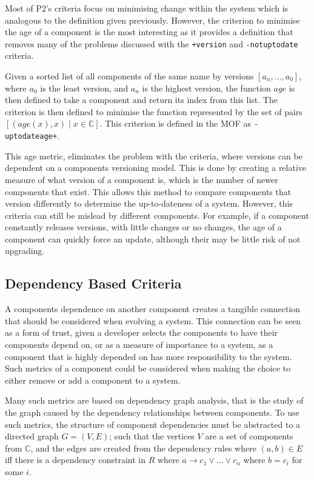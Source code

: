Most of P2's criteria focus on minimising change within the system which is analogous to the definition given previously.
However, the criterion to minimise the age of a component is the most interesting as it provides a definition that removes many of the problems
discussed with the  \verb!+version! and \verb+-notuptodate+ criteria.

\begin{defs}
Given a sorted list of all components of the same name by versions $[a_n,\ldots,a_0]$, where $a_0$ is the least version, and $a_n$ is the highest version,
the function $age$ is then defined to take a component and return its index from this list.
The criterion is then defined to minimise the function represented by the set of pairs $[(age(x), x) \mid x \in \mathbb{C}]$.
This criterion is defined in the MOF as \verb!-uptodateage+!.
\end{defs}

This age metric, eliminates the problem with the criteria, where versions can be dependent on a components versioning model.
This is done by creating a relative measure of what version of a component is, which is the number of newer components that exist.
This allows this method to compare components that version differently to determine the up-to-dateness of a system.
However, this criteria can still be mislead by different components.
For example, if a component constantly releases versions, with little changes or no changes, the age of a component can quickly force an update, 
although their may be little risk of not upgrading. 


\subsection{Dependency Based Criteria}
A components dependence on another component creates a tangible connection that should be considered when evolving a system.
This connection can be seen as a form of trust, given a developer selects the components to have their components depend on,
or as a measure of importance to a system, as a component that is highly depended on has more responsibility to the system.
Such metrics of a component could be considered when making the choice to either remove or add a component to a system.

Many such metrics are based on dependency graph analysis, that is the study of the graph caused by the dependency relationships between components. 
To use such metrics, the structure of component dependencies must be abstracted to a directed graph $G = (V,E)$;
such that the vertices $V$ are a set of components from $\mathbb{C}$, 
and the edges are created from the dependency rules where $(a,b) \in E$ iff there is a dependency constraint in $R$ 
where $a \rightarrow c_1 \vee \ldots \vee c_n$ where $b = c_i$ for some $i$.

